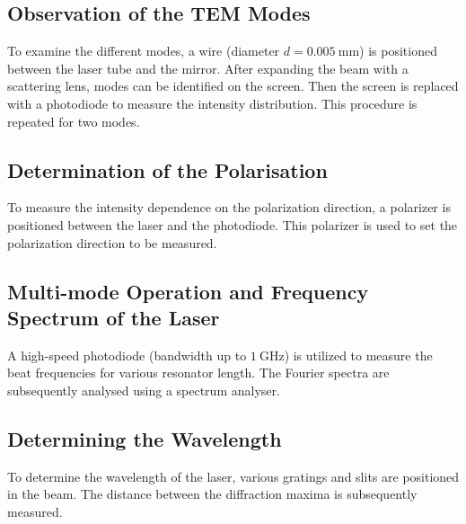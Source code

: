 \subsection{Observation of the TEM Modes}
To examine the different modes, a wire (diameter $d=\SI{0.005}{\milli\meter}$)
is positioned between the laser tube and the mirror. After expanding 
the beam with a scattering lens, modes can be identified on the screen.
Then the screen is replaced with a photodiode to measure the intensity
distribution. This procedure is repeated for two modes.
\subsection{Determination of the Polarisation}
To measure the intensity dependence on the polarization direction, a 
polarizer is positioned between the laser and the photodiode. This 
polarizer is used to set the polarization direction to be measured.
\subsection{Multi-mode Operation and Frequency Spectrum of the Laser}
A high-speed photodiode (bandwidth up to $\SI{1}{\giga\hertz}$) is
utilized to measure the beat frequencies for various resonator length. 
The Fourier spectra are subsequently analysed using a spectrum analyser.
\subsection{Determining the Wavelength}
To determine the wavelength of the laser, various gratings and slits are 
positioned in the beam. The distance between the diffraction maxima is 
subsequently measured.
